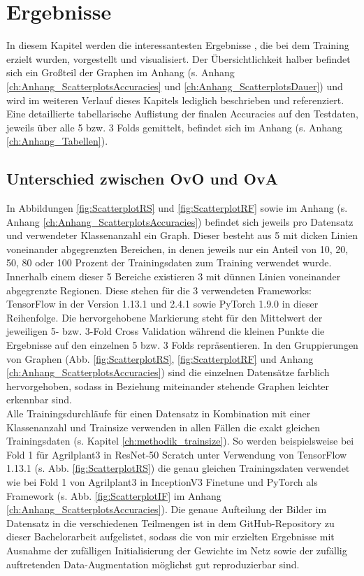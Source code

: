 \chapter{Ergebnisse}
\label{ch:ergebnisse}
In diesem Kapitel werden die interessantesten Ergebnisse \cite{githubRepo}, die bei dem Training erzielt wurden, vorgestellt und visualisiert. Der Übersichtlichkeit halber befindet sich ein Großteil der Graphen im Anhang (s. Anhang \ref{ch:Anhang_ScatterplotsAccuracies} und \ref{ch:Anhang_ScatterplotsDauer}) und wird im weiteren Verlauf dieses Kapitels lediglich beschrieben und referenziert.
Eine detaillierte tabellarische Auflistung der finalen Accuracies auf den Testdaten, jeweils über alle 5 bzw. 3 Folds gemittelt, befindet sich im Anhang (s. Anhang \ref{ch:Anhang_Tabellen}).

\section{Unterschied zwischen OvO und OvA}
\label{ch:ergebnisseOvOOvA}
In Abbildungen \ref{fig:ScatterplotRS} und \ref{fig:ScatterplotRF} sowie im Anhang (s. Anhang \ref{ch:Anhang_ScatterplotsAccuracies}) befindet sich jeweils pro Datensatz und verwendeter Klassenanzahl ein Graph. Dieser besteht aus 5 mit dicken Linien voneinander abgegrenzten Bereichen, in denen jeweils nur ein Anteil von 10, 20, 50, 80 oder 100 Prozent der Trainingsdaten zum Training verwendet wurde. Innerhalb einem dieser 5 Bereiche existieren 3 mit dünnen Linien voneinander abgegrenzte Regionen. Diese stehen für die 3 verwendeten Frameworks: TensorFlow in der Version 1.13.1 und 2.4.1 \cite{tensorflow} sowie PyTorch 1.9.0 \cite{pytorch} in dieser Reihenfolge. Die hervorgehobene Markierung steht für den Mittelwert der jeweiligen 5- bzw. 3-Fold Cross Validation während die kleinen Punkte die Ergebnisse auf den einzelnen 5 bzw. 3 Folds repräsentieren.
In den Gruppierungen von Graphen (Abb. \ref{fig:ScatterplotRS}, \ref{fig:ScatterplotRF} und Anhang \ref{ch:Anhang_ScatterplotsAccuracies}) sind die einzelnen Datensätze farblich hervorgehoben, sodass in Beziehung miteinander stehende Graphen leichter erkennbar sind.\\

Alle Trainingsdurchläufe für einen Datensatz in Kombination mit einer Klassenanzahl und Trainsize verwenden in allen Fällen die exakt gleichen Trainingsdaten (s. Kapitel \ref{ch:methodik_trainsize}). So werden beispielsweise bei Fold 1 für Agrilplant3 in ResNet-50 Scratch unter Verwendung von TensorFlow 1.13.1 \cite{tensorflow} (s. Abb. \ref{fig:ScatterplotRS}) die genau gleichen Trainingsdaten verwendet wie bei Fold 1 von Agrilplant3 in InceptionV3 Finetune und PyTorch \cite{pytorch} als Framework (s. Abb. \ref{fig:ScatterplotIF} im Anhang \ref{ch:Anhang_ScatterplotsAccuracies}). Die genaue Aufteilung der Bilder im Datensatz in die verschiedenen Teilmengen ist in dem GitHub-Repository zu dieser Bachelorarbeit \cite{githubRepo} aufgelistet, sodass die von mir erzielten Ergebnisse mit Ausnahme der zufälligen Initialisierung der Gewichte im Netz sowie der zufällig auftretenden Data-Augmentation möglichst gut reproduzierbar sind.\\

